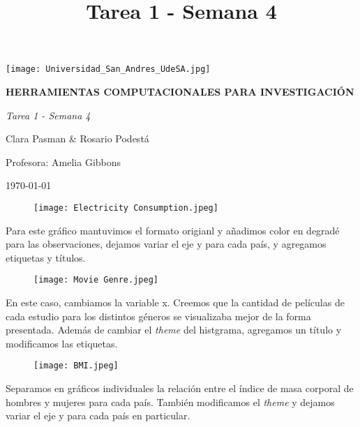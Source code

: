 \documentclass[12pt, spanish]{article}
\begin{document}
\title{Tarea 1 - Semana 4}


\thispagestyle{empty}
\begin{center}
\texttt{[image: Universidad\_San\_Andres\_UdeSA.jpg]}
\end{center}

	\begin{center}
	\LARGE
\textbf{HERRAMIENTAS COMPUTACIONALES PARA INVESTIGACIÓN}
	

	\vspace{1.5 cm}
	\LARGE
	\textit{Tarea 1 - Semana 4}

	\vspace{1 cm}
	\Large
	Clara Pasman \& Rosario Podestá\
	
	\vspace{1.3cm}
	\Large	
	Profesora: Amelia Gibbons\

	
	\vspace{1 cm}
	\normalsize
	\today
	\end{center}
	
\clearpage

\begin{figure}
    \centering
    \texttt{[image: Electricity Consumption.jpeg]}
    \caption{}
    \label{fig:my_label}
\end{figure}
Para este gráfico mantuvimos el formato origianl y añadimos color en degradé para las observaciones, dejamos variar el eje y para cada país, y agregamos etiquetas y títulos. 

\clearpage

\begin{figure}
    \centering
    \texttt{[image: Movie Genre.jpeg]}
    \caption{}
    \label{fig:my_label}
\end{figure}

En este caso, cambiamos la variable x. Creemos que la cantidad de películas de cada estudio para los distintos géneros se visualizaba mejor de la forma presentada. Además de cambiar el \textit{theme} del histgrama, agregamos un título y modificamos las etiquetas. 
\clearpage

\begin{figure}
    \centering
    \texttt{[image: BMI.jpeg]}
    \caption{}
    \label{fig:my_label}
\end{figure}
Separamos en gráficos individuales la relación entre el índice de masa corporal de hombres y mujeres para cada país. También  modificamos el \textit{theme} y dejamos variar el eje y para cada país en particular. 
\end{document}

